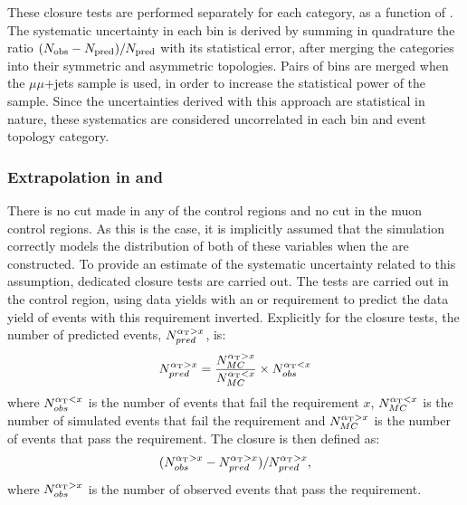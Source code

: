These closure tests are performed separately for each \njet category,
as a function of \HT. The systematic uncertainty in each \HT bin
is derived by summing in quadrature the ratio $(N_{\textrm{obs}} - N_{\textrm{pred}})/N_{\textrm{pred}}$
with its statistical error, after merging the \njet categories into
their symmetric and asymmetric topologies. Pairs of \HT bins are merged
when the $\mu\mu$+jets sample is used, in order to increase the
statistical power of the sample.  Since the uncertainties derived with
this approach are statistical in nature, these systematics are
considered uncorrelated in each \HT bin and event topology category. 

\subsubsection*{Extrapolation in \alphat and \bdphi}
\label{sec:tfSyst_alphaT}

There is no \bdphi cut made in any of the control regions and no
\alphat cut in the muon control regions. As this is the case, it is
implicitly assumed that the simulation correctly models the
distribution of both of these variables when the \TFs are constructed.
To provide an estimate of the systematic uncertainty related to this
assumption, dedicated closure tests are carried out.  
The tests are carried out in the \mj control region, using data yields
with an \alphat or \bdphi requirement to predict the data yield of
events with this requirement inverted. Explicitly for the \alphat
closure tests, the number of
predicted events, $N^{\alpha_{\text{T}}>x}_{pred}$, is: 
\begin{equation}
N^{\alpha_{\text{T}}>x}_{pred} =
\frac{N^{\alpha_{\text{T}}>x}_{MC}}{N^{\alpha_{\text{T}}<x}_{MC}}\times N^{\alpha_{\text{T}}<x}_{obs} 
\end{equation}
where $N^{\alpha_{\text{T}}<x}_{obs}$ is the number of events that fail the
\alphat requirement $x$, $N^{\alpha_{\text{T}}<x}_{MC}$ is the number of simulated
events that fail the requirement and $N^{\alpha_{\text{T}}>x}_{MC}$ is the
number of events that pass the requirement. The closure is then
defined as:
\begin{equation}
(N^{\alpha_{\text{T}}>x}_{obs}-N^{\alpha_{\text{T}}>x}_{pred})/N^{\alpha_{\text{T}}>x}_{pred},
\end{equation}
where $N^{\alpha_{\text{T}}>x}_{obs}$ is the number of observed events that pass
the \alphat requirement.

